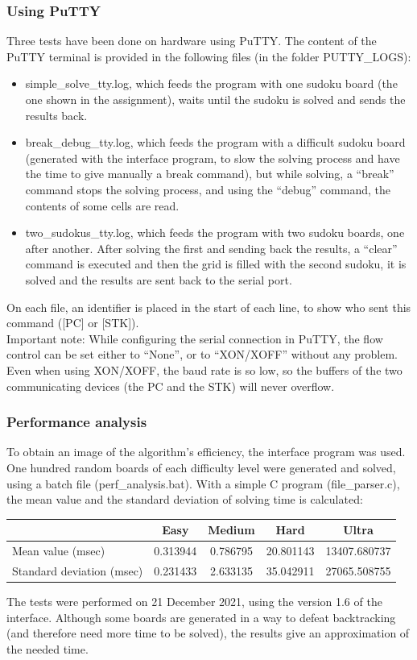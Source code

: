 \documentclass[12pt, a4, hidelinks]{article}
\begin{document}
\subsubsection*{Using PuTTY}
Three tests have been done on hardware using PuTTY. The content of the PuTTY terminal is provided in the following files (in the folder PUTTY\_LOGS):
\begin{itemize}
\item simple\_solve\_tty.log, which feeds the program with one sudoku board (the one shown in the assignment), waits until the sudoku is solved and sends the results back.
\item break\_debug\_tty.log, which feeds the program with a difficult sudoku board (generated with the interface program, to slow the solving process and have the time to give manually a break command), but while solving, a ``break'' command stops the solving process, and using the ``debug'' command, the contents of some cells are read.
\item two\_sudokus\_tty.log, which feeds the program with two sudoku boards, one after another. After solving the first and sending back the results, a ``clear'' command is executed and then the grid is filled with the second sudoku, it is solved and the results are sent back to the serial port.
\end{itemize}
On each file, an identifier is placed in the start of each line, to show who sent this command ([PC] or [STK]).\\
Important note: While configuring the serial connection in PuTTY, the flow control can be set either to ``None'', or to ``XON/XOFF'' without any problem. Even when using XON/XOFF, the baud rate is so low, so the buffers of the two communicating devices (the PC and the STK) will never overflow.

\subsubsection*{Performance analysis}
To obtain an image of the algorithm's efficiency, the interface program was used. One hundred random boards of each difficulty level were generated and solved, using a batch file (perf\_analysis.bat). With a simple C program (file\_parser.c), the mean value and the standard deviation of solving time is calculated:
\begin{center}
\begin{tabular}{ |l|c|c|c|c| } 
 \hline
                                      & Easy         & Medium & Hard & Ultra  \\  \hline
Mean value (msec)           &  0.313944  &  0.786795   &  20.801143       &  13407.680737        \\ \hline
Standard deviation (msec) &  0.231433  & 2.633135   & 35.042911        &  27065.508755         \\ \hline
\end{tabular}
\end{center}
\noindent The tests were performed on 21 December 2021, using the version 1.6 of the interface. Although some boards are generated in a way to defeat backtracking (and therefore need more time to be solved), the results give an approximation of the needed time.
\end{document}
